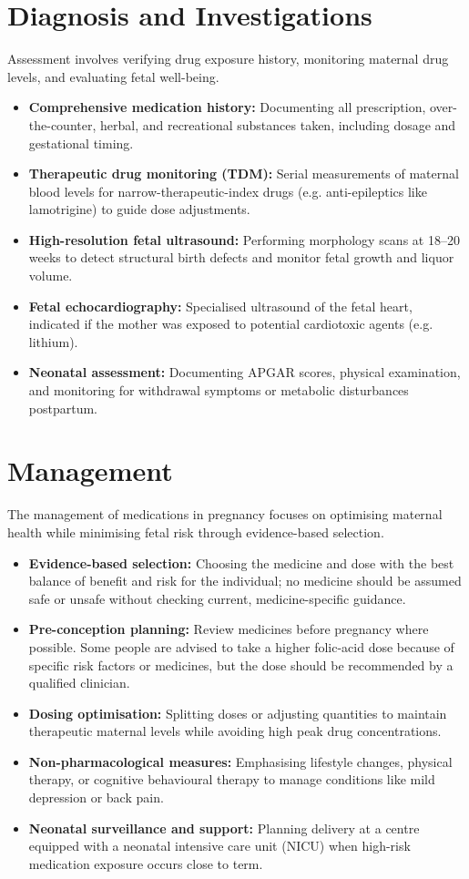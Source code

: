 \section*{Diagnosis and Investigations}
Assessment involves verifying drug exposure history, monitoring maternal drug levels, and evaluating fetal well-being.
\begin{itemize}
    \item \textbf{Comprehensive medication history:} Documenting all prescription, over-the-counter, herbal, and recreational substances taken, including dosage and gestational timing.
    \item \textbf{Therapeutic drug monitoring (TDM):} Serial measurements of maternal blood levels for narrow-therapeutic-index drugs (e.g. anti-epileptics like lamotrigine) to guide dose adjustments.
    \item \textbf{High-resolution fetal ultrasound:} Performing morphology scans at 18--20 weeks to detect structural birth defects and monitor fetal growth and liquor volume.
    \item \textbf{Fetal echocardiography:} Specialised ultrasound of the fetal heart, indicated if the mother was exposed to potential cardiotoxic agents (e.g. lithium).
    \item \textbf{Neonatal assessment:} Documenting APGAR scores, physical examination, and monitoring for withdrawal symptoms or metabolic disturbances postpartum.
\end{itemize}

\section*{Management}
The management of medications in pregnancy focuses on optimising maternal health while minimising fetal risk through evidence-based selection.
\begin{itemize}
    \item \textbf{Evidence-based selection:} Choosing the medicine and dose with the best balance of benefit and risk for the individual; no medicine should be assumed safe or unsafe without checking current, medicine-specific guidance.
    \item \textbf{Pre-conception planning:} Review medicines before pregnancy where possible. Some people are advised to take a higher folic-acid dose because of specific risk factors or medicines, but the dose should be recommended by a qualified clinician.
    \item \textbf{Dosing optimisation:} Splitting doses or adjusting quantities to maintain therapeutic maternal levels while avoiding high peak drug concentrations.
    \item \textbf{Non-pharmacological measures:} Emphasising lifestyle changes, physical therapy, or cognitive behavioural therapy to manage conditions like mild depression or back pain.
    \item \textbf{Neonatal surveillance and support:} Planning delivery at a centre equipped with a neonatal intensive care unit (NICU) when high-risk medication exposure occurs close to term.
\end{itemize}

